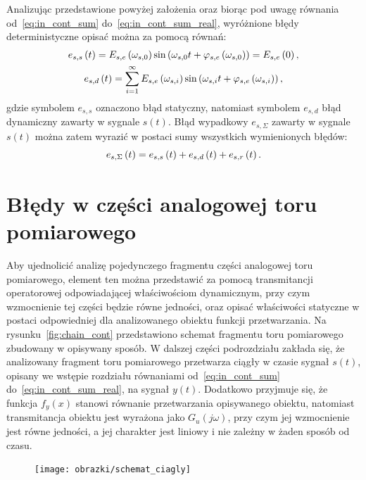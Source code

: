 Analizując przedstawione powyżej założenia oraz biorąc pod uwagę równania od~\eqref{eq:in_cont_sum} do~\eqref{eq:in_cont_sum_real}, wyróżnione błędy deterministyczne opisać można za pomocą równań:
\begin{gather}
e_{s,s} \left(t\right) = E_{s,e} \left(\omega_{s,0}\right) \sin \left( \omega_{s,0} t + \varphi_{s,e} \left(\omega_{s,0}\right) \right) = E_{s,e} \left(0\right) \label{eq:in_cont_err_stat}, \\
e_{s,d} \left(t\right) = \sum _{i = 1} ^{\infty} E_{s,e} \left(\omega_{s,i}\right) \sin \left( \omega_{s,i} t + \varphi_{s,e} \left(\omega_{s,i}\right) \right) \label{eq:in_cont_err_dyn},
\end{gather}
gdzie symbolem $e_{s,s}$ oznaczono błąd statyczny, natomiast symbolem $e_{s,d}$ błąd dynamiczny zawarty w sygnale $s(t)$. Błąd wypadkowy $e_{s,\Sigma}$ zawarty w sygnale $s(t)$ można zatem wyrazić w postaci sumy wszystkich wymienionych błędów:
\begin{equation}
e_{s,\Sigma} \left(t\right) = e_{s,s} \left(t\right) + e_{s,d} \left(t\right) + e_{s,r} \left(t\right) \label{eq:in_cont_err_sum}.
\end{equation}

\section{Błędy w części analogowej toru pomiarowego}

Aby ujednolicić analizę pojedynczego fragmentu części analogowej toru pomiarowego, element ten można przedstawić za pomocą transmitancji operatorowej odpowiadającej właściwościom dynamicznym, przy czym wzmocnienie tej części będzie równe jedności, oraz opisać właściwości statyczne w postaci odpowiedniej dla analizowanego obiektu funkcji przetwarzania. Na rysunku~\ref{fig:chain_cont} przedstawiono schemat fragmentu toru pomiarowego zbudowany w opisywany sposób. W dalszej części podrozdziału zakłada się, że analizowany fragment toru pomiarowego przetwarza ciągły w czasie sygnał $s(t)$, opisany we wstępie rozdziału równaniami od~\eqref{eq:in_cont_sum} do~\eqref{eq:in_cont_sum_real}, na sygnał $y(t)$. Dodatkowo przyjmuje się, że funkcja $f_{y}(x)$ stanowi równanie przetwarzania opisywanego obiektu, natomiast transmitancja obiektu jest wyrażona jako $G_{u}(j\omega)$, przy czym jej wzmocnienie jest równe jedności, a jej charakter jest liniowy i nie zależny w żaden sposób od czasu.

\begin{figure}[htb!]
\begin{center}
\texttt{[image: obrazki/schemat\_ciagly]}
\end{center}
\end{figure}

